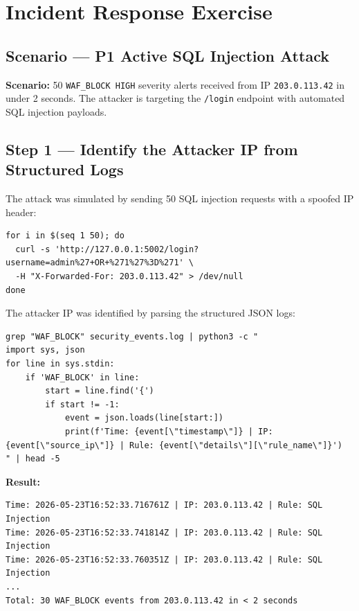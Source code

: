 \documentclass[12pt,a4paper]{report}
\begin{document}
\section{Incident Response Exercise}

\subsection{Scenario — P1 Active SQL Injection Attack}

\begin{warningbox}
\textbf{Scenario:} 50 \texttt{WAF\_BLOCK HIGH} severity alerts received from IP \texttt{203.0.113.42} in under 2 seconds. The attacker is targeting the \texttt{/login} endpoint with automated SQL injection payloads.
\end{warningbox}

\subsection{Step 1 — Identify the Attacker IP from Structured Logs}

The attack was simulated by sending 50 SQL injection requests with a spoofed IP header:

\begin{lstlisting}[style=bashstyle, caption={Simulating the attack}]
for i in $(seq 1 50); do
  curl -s 'http://127.0.0.1:5002/login?username=admin%27+OR+%271%27%3D%271' \
  -H "X-Forwarded-For: 203.0.113.42" > /dev/null
done
\end{lstlisting}

The attacker IP was identified by parsing the structured JSON logs:

\begin{lstlisting}[style=bashstyle, caption={Identifying attacker from WAF logs}]
grep "WAF_BLOCK" security_events.log | python3 -c "
import sys, json
for line in sys.stdin:
    if 'WAF_BLOCK' in line:
        start = line.find('{')
        if start != -1:
            event = json.loads(line[start:])
            print(f'Time: {event[\"timestamp\"]} | IP: {event[\"source_ip\"]} | Rule: {event[\"details\"][\"rule_name\"]}')
" | head -5
\end{lstlisting}

\textbf{Result:}
\begin{lstlisting}[style=httpstyle]
Time: 2026-05-23T16:52:33.716761Z | IP: 203.0.113.42 | Rule: SQL Injection
Time: 2026-05-23T16:52:33.741814Z | IP: 203.0.113.42 | Rule: SQL Injection
Time: 2026-05-23T16:52:33.760351Z | IP: 203.0.113.42 | Rule: SQL Injection
...
Total: 30 WAF_BLOCK events from 203.0.113.42 in < 2 seconds
\end{lstlisting}
\end{document}
